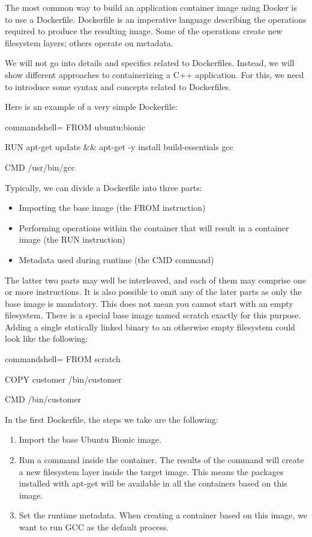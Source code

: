 The most common way to build an application container image using Docker is to use a Dockerfile. Dockerfile is an imperative language describing the operations required to produce the resulting image. Some of the operations create new filesystem layers; others operate on metadata.

We will not go into details and specifics related to Dockerfiles. Instead, we will show different approaches to containerizing a C++ application. For this, we need to introduce some syntax and concepts related to Dockerfiles.

Here is an example of a very simple Dockerfile:

\begin{tcblisting}{commandshell={}}
FROM ubuntu:bionic

RUN apt-get update && apt-get -y install build-essentials gcc

CMD /usr/bin/gcc
\end{tcblisting}

Typically, we can divide a Dockerfile into three parts:

\begin{itemize}
\item 
Importing the base image (the FROM instruction)

\item 
Performing operations within the container that will result in a container image (the RUN instruction)

\item 
Metadata used during runtime (the CMD command)
\end{itemize}

The latter two parts may well be interleaved, and each of them may comprise one or more instructions. It is also possible to omit any of the later parts as only the base image is mandatory. This does not mean you cannot start with an empty filesystem. There is a special base image named scratch exactly for this purpose. Adding a single statically linked binary to an otherwise empty filesystem could look like the following:

\begin{tcblisting}{commandshell={}}
FROM scratch

COPY customer /bin/customer

CMD /bin/customer
\end{tcblisting}

In the first Dockerfile, the steps we take are the following:

\begin{enumerate}
\item 
Import the base Ubuntu Bionic image.

\item
Run a command inside the container. The results of the command will create a new filesystem layer inside the target image. This means the packages installed with apt-get will be available in all the containers based on this image.

\item
Set the runtime metadata. When creating a container based on this image, we want to run GCC as the default process.
\end{enumerate}

